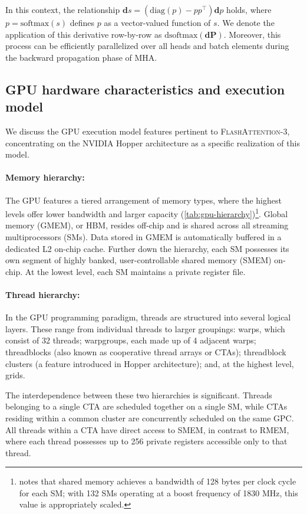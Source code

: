 \begin{enumerate}
In this context, the relationship $\mathbf{d}s = (\mathrm{diag}(p) - p p^\top)\mathbf{d}p$ holds, where $p = \mathrm{softmax}(s)$ defines $p$ as a vector-valued function of $s$. We denote the application of this derivative row-by-row as $\mathrm{dsoftmax}(\mathbf{dP})$. Moreover, this process can be efficiently parallelized over all heads and batch elements during the backward propagation phase of MHA.

\subsection{GPU hardware characteristics and execution model}
\label{subsec:hardware}

We discuss the GPU execution model features pertinent to \textsc{FlashAttention-3}, concentrating on the NVIDIA Hopper architecture as a specific realization of this model.

\paragraph{Memory hierarchy:} The GPU features a tiered arrangement of memory types, where the highest levels offer lower bandwidth and larger capacity (\cref{tab:gpu-hierarchy})\footnote{\citet{luo2024benchmarking} notes that shared memory achieves a bandwidth of 128 bytes per clock cycle for each SM; with 132 SMs operating at a boost frequency of 1830 MHz, this value is appropriately scaled.}. Global memory (GMEM), or HBM, resides off-chip and is shared across all streaming multiprocessors (SMs). Data stored in GMEM is automatically buffered in a dedicated L2 on-chip cache. Further down the hierarchy, each SM possesses its own segment of highly banked, user-controllable shared memory (SMEM) on-chip. At the lowest level, each SM maintains a private register file.

\paragraph{Thread hierarchy:} In the GPU programming paradigm, threads are structured into several logical layers. These range from individual threads to larger groupings: warps, which consist of 32 threads; warpgroups, each made up of 4 adjacent warps; threadblocks (also known as cooperative thread arrays or CTAs); threadblock clusters (a feature introduced in Hopper architecture); and, at the highest level, grids.

The interdependence between these two hierarchies is significant. Threads belonging to a single CTA are scheduled together on a single SM, while CTAs residing within a common cluster are concurrently scheduled on the same GPC. All threads within a CTA have direct access to SMEM, in contrast to RMEM, where each thread possesses up to 256 private registers accessible only to that thread.


\end{enumerate}
